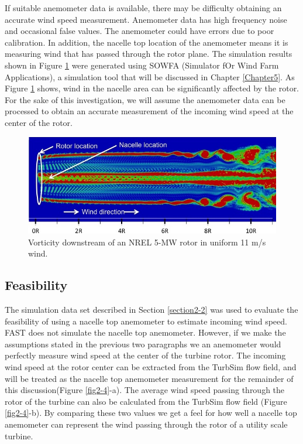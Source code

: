 If suitable anemometer data is available, there may be difficulty obtaining an accurate wind speed measurement. Anemometer data  has high frequency noise and occasional false values. The anemometer could have errors due to poor calibration. In addition, the nacelle top location of the anemometer means it is measuring wind that has passed through the rotor plane. The simulation results shown in Figure \ref{fig2-3} were generated using SOWFA (Simulator fOr Wind Farm Applications), a simulation tool that will be discussed in Chapter \ref{Chapter5}. As Figure \ref{fig2-3} shows, wind in the nacelle area can be significantly affected by the rotor. For the sake of this investigation, we will assume the anemometer data can be processed to obtain an accurate measurement of the incoming wind speed at the center of the rotor.



\begin{figure}[htbp]
	\centering
		\includegraphics[width = \linewidth]{Figures/ch2Figures/fig2-3.jpg}
		
	\caption{Vorticity downstream of an NREL 5-MW rotor in uniform 11 m/s wind.}
	\label{fig2-3}
\end{figure}





\subsection{Feasibility} \label{section2-3-1} 

The simulation data set described in Section \ref{section2-2} was used to evaluate the feasibility of using a nacelle top anemometer to estimate incoming wind speed.  FAST does not simulate the nacelle top anemometer. However, if we make the assumptions stated in the previous two paragraphs we an anemometer would perfectly measure wind speed at the center of the turbine rotor. The  incoming wind speed at the rotor center can be extracted from the TurbSim flow field, and will be treated as the nacelle top anemometer measurement for the remainder of this discussion(Figure \ref{fig2-4}-a). The average wind speed passing through the rotor of the turbine can also be calculated from the TurbSim flow field (Figure  \ref{fig2-4}-b). By comparing these two values we get a feel for how well a nacelle top anemometer can represent the wind passing through the rotor of a utility scale turbine.

